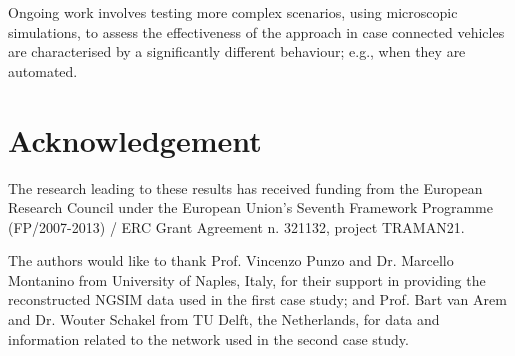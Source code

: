 \documentclass[titlepage,oneside,fleqn,12pt]{article}
\begin{document}
Ongoing work involves testing more complex scenarios, using microscopic simulations, to assess the effectiveness of the approach in case connected vehicles are characterised by a significantly different behaviour; e.g., when they are automated.


\section*{Acknowledgement}
The research leading to these results has received funding from the European Research Council under the European Union's Seventh Framework Programme (FP/2007-2013) / ERC Grant Agreement n. 321132, project TRAMAN21.

The authors would like to thank Prof. Vincenzo Punzo and Dr. Marcello Montanino from University of Naples, Italy, for their support in providing the reconstructed  NGSIM data used in the first case study; and Prof. Bart van Arem and Dr. Wouter Schakel from TU Delft, the Netherlands, for data and information related to the network used in the second case study.

\clearpage



\end{document}
